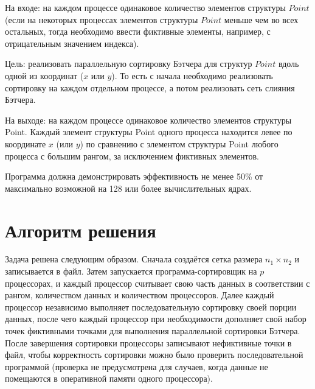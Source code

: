 \documentclass[14pt]{extarticle}
\begin{document}
На входе: на каждом процессе одинаковое количество элементов структуры $Point$ (если на некоторых процессах элементов структуры $Point$ меньше чем во всех остальных, тогда необходимо ввести фиктивные элементы, например, с отрицательным значением индекса).

Цель: реализовать параллельную сортировку Бэтчера для структур $Point$ вдоль одной из координат ($x$ или $y$). То есть с начала необходимо реализовать сортировку на каждом отдельном процессе, а потом реализовать сеть слияния Бэтчера.

На выходе: на каждом процессе одинаковое количество элементов структуры Point. Каждый элемент структуры Point одного процесса находится левее по координате $x$ (или $y$) по сравнению с элементом структуры Point любого процесса с большим рангом, за исключением фиктивных элементов.

Программа должна демонстрировать эффективность не менее 50\% от максимально возможной на 128 или более вычислительных ядрах.

\section{Алгоритм решения}
Задача решена следующим образом. Сначала создаётся сетка размера $n_1 \times n_2$ и записывается в файл. Затем запускается программа-сортировщик на $p$ процессорах, и каждый процессор считывает свою часть данных в соответствии с рангом, количеством данных и количеством процессоров. Далее каждый процессор независимо выполняет последовательную сортировку своей порции данных, после чего каждый процессор при необходимости дополняет свой набор точек фиктивными точками для выполнения параллельной сортировки Бэтчера. После завершения сортировки процессоры записывают нефиктивные точки в файл, чтобы корректность сортировки можно было проверить последовательной программой (проверка не предусмотрена для случаев, когда данные не помещаются в оперативной памяти одного процессора).
\end{document}
